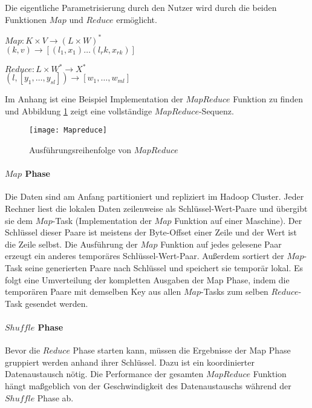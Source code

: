 Die eigentliche Parametrisierung durch den Nutzer wird durch die beiden Funktionen $Map$ und $Reduce$ ermöglicht.

\begin{center}
    $Map: K \times V \rightarrow (L \times W)^\ast$\\$(k, v) \rightarrow [(l_1, x_1) \dots (l_rk, x_{rk})]$
\end{center}
\begin{center}
    $Reduce: L \times W^\ast \rightarrow X^\ast$\\$(l, [y_1, \dots, y_{sl}]) \rightarrow [w_1, \dots, w_{ml}]$
\end{center}

Im Anhang ist eine Beispiel Implementation der $MapReduce$ Funktion zu finden und Abbildung \ref{fig:mapreduce} zeigt eine vollständige $MapReduce$-Sequenz.

\begin{figure}[!h]
    \centering
    \texttt{[image: Mapreduce]}
    \caption{Ausführungsreihenfolge von $MapReduce$\cite{dg04}}
    \label{fig:mapreduce}
\end{figure}

\paragraph{$Map$ Phase}$\;$ \\
Die Daten sind am Anfang partitioniert und repliziert im Hadoop Cluster. Jeder Rechner liest die lokalen Daten zeilenweise als Schlüssel-Wert-Paare und übergibt sie dem $Map$-Task (Implementation der $Map$ Funktion auf einer Maschine). Der Schlüssel dieser Paare ist meistens der Byte-Offset einer Zeile und der Wert ist die Zeile selbst. Die Ausführung der $Map$ Funktion auf jedes gelesene Paar erzeugt ein anderes temporäres Schlüssel-Wert-Paar. Außerdem sortiert der $Map$-Task seine generierten Paare nach Schlüssel und speichert sie temporär lokal. Es folgt eine Umverteilung der kompletten Ausgaben der Map Phase, indem die temporären Paare mit demselben Key aus allen $Map$-Tasks zum selben $Reduce$-Task gesendet werden.

\paragraph{$Shuffle$ Phase}$\;$ \\
Bevor die $Reduce$ Phase starten kann, müssen die Ergebnisse der Map Phase gruppiert werden anhand ihrer Schlüssel. Dazu ist ein koordinierter Datenaustausch nötig. Die Performance der gesamten $MapReduce$ Funktion hängt maßgeblich von der Geschwindigkeit des Datenaustauschs während der $Shuffle$ Phase ab.

